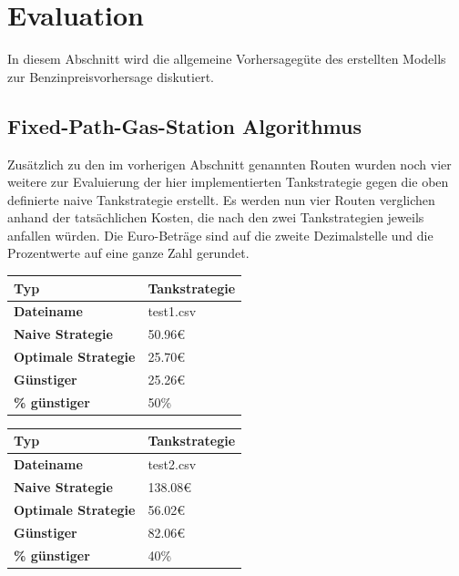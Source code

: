 \documentclass[
ngerman          %
,a4paper          %
,11pt
,pdftex
]{report}
\begin{document}
\section{Evaluation}
In diesem Abschnitt wird die allgemeine Vorhersagegüte des erstellten Modells zur Benzinpreisvorhersage diskutiert.

\subsection{Fixed-Path-Gas-Station Algorithmus}
Zusätzlich zu den im vorherigen Abschnitt genannten Routen wurden noch vier weitere zur Evaluierung der hier implementierten Tankstrategie gegen die oben definierte naive Tankstrategie erstellt. Es werden nun vier Routen verglichen anhand der tatsächlichen Kosten, die nach den zwei Tankstrategien jeweils anfallen würden. Die Euro-Beträge sind auf die zweite Dezimalstelle und die Prozentwerte auf eine ganze Zahl gerundet.

\begin{table}[H]
	\centering
	\begin{tabular}{l l}
		\textbf{Typ} & \textbf{Tankstrategie} \\ 
		\hline
		\hline
		\textbf{Dateiname} & test1.csv \\
        \textbf{Naive Strategie} & 50.96\euro{} \\
        \textbf{Optimale Strategie} & 25.70\euro{} \\
  		\textbf{Günstiger} & 25.26\euro{} \\
        \textbf{\% günstiger} & 50\% \\
		\hline 
	\end{tabular}
\end{table} 

\begin{table}[H]
	\centering
	\begin{tabular}{l l}
		\textbf{Typ} & \textbf{Tankstrategie} \\ 
		\hline
		\hline
		\textbf{Dateiname} & test2.csv \\
        \textbf{Naive Strategie} & 138.08\euro{} \\
        \textbf{Optimale Strategie} & 56.02\euro{} \\
  		\textbf{Günstiger} & 82.06\euro{} \\
        \textbf{\% günstiger} & 40\% \\
		\hline 
	\end{tabular}
\end{table} 
\end{document}
